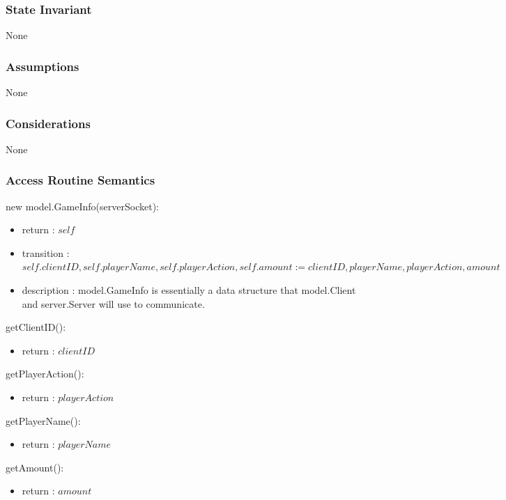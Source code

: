 \documentclass[12pt, titlepage]{article}
\begin{document}
    \subsubsection* {State Invariant}
        None
    
    \subsubsection* {Assumptions}
        None
    
    \subsubsection* {Considerations}
        None
    
    \subsubsection* {Access Routine Semantics}
    
        \noindent new model.GameInfo(serverSocket):
        \begin{itemize}
        \item return : $self$
        \item transition : $self.clientID, self.playerName, self.playerAction, self.amount := clientID, playerName, playerAction, amount$
        \item description : model.GameInfo is essentially a data structure that model.Client and server.Server will use to communicate.
        \end{itemize}
        
        \noindent getClientID():
        \begin{itemize}
        \item return : $clientID$
        \end{itemize}
        
        \noindent getPlayerAction():
        \begin{itemize}
        \item return : $playerAction$
        \end{itemize}
        
        \noindent getPlayerName():
        \begin{itemize}
        \item return : $playerName$
        \end{itemize}
        
        \noindent getAmount():
        \begin{itemize}
        \item return : $amount$
        \end{itemize}
        
\end{document}

